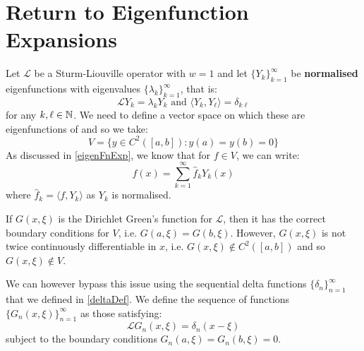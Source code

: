 \documentclass[../main.tex]{subfiles}
\begin{document}
\section{Return to Eigenfunction Expansions}
Let $\mathcal{L}$ be a Sturm-Liouville operator with $w = 1$ and let $\{Y_k\}_{k = 1}^{\infty}$ be \textbf{normalised} eigenfunctions with eigenvalues $\{\lambda_k\}_{k = 1}^{\infty}$, that is:
\[
  \mathcal{L}Y_k = \lambda_k Y_k \text{ and } \langle Y_k, Y_\ell \rangle = \delta_{k \ell}
\]
for any $k, \ell \in \mathbb{N}$.
We need to define a vector space on which these are eigenfunctions of and so we take:
\[
  V = \{y \in C^2([a, b]): y(a) = y(b) = 0\}
\]
As discussed in \cref{eigenFnExp}, we know that for $f \in V$, we can write:
\[
  f(x) = \sum_{k = 1}^{\infty} \hat{f}_k Y_k(x)
\]
where $\hat{f}_k = \langle f, Y_k \rangle$ as $Y_k$ is normalised.

If $G(x, \xi)$ is the Dirichlet Green's function for $\mathcal{L}$, then it has the correct boundary conditions for $V$, i.e. $G(a, \xi) = G(b, \xi)$.
However, $G(x, \xi)$ is not twice continuously differentiable in $x$, i.e. $G(x, \xi) \notin C^2([a, b])$ and so $G(x, \xi) \notin V$.

We can however bypass this issue using the sequential delta functions $\{\delta_n\}_{n = 1}^{\infty}$ that we defined in \cref{deltaDef}.
We define the sequence of functions $\{G_n(x, \xi)\}_{n = 1}^{\infty}$ as those satisfying:
\[
  \mathcal{L}G_n(x, \xi) = \delta_n(x - \xi)
\]
subject to the boundary conditions $G_n(a, \xi) = G_n(b, \xi) = 0$.
\end{document}
